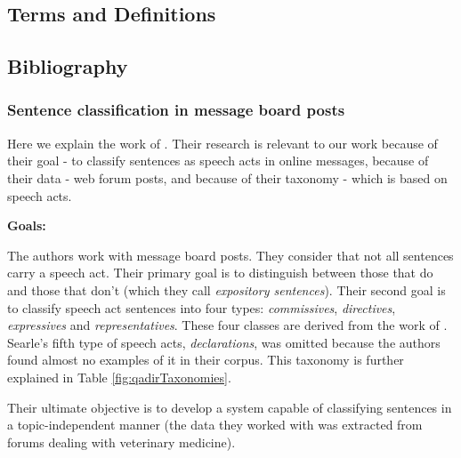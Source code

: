 \documentclass[11pt]{article}
\begin{document}

\subsection{Terms and Definitions}


\subsection{Bibliography}


\subsubsection{Sentence classification in message board posts}

Here we explain the work of \cite{qadir2011classifying}. Their research is relevant to our work because of their goal - to classify sentences as speech acts in online messages, because of their data - web forum posts, and because of their taxonomy - which is based on speech acts.

\vspace{0.5cm}
\textbf{Goals:}
\vspace{0.1cm}

The authors work with message board posts. They consider that not all sentences carry a speech act. Their primary goal is to distinguish between those that do and those that don't (which they call \textit{expository sentences}). Their second goal is to classify speech act sentences into four types: \textit{commissives}, \textit{directives}, \textit{expressives} and \textit{representatives}. These four classes are derived from the work of \cite{searle1976taxonomy}. Searle's fifth type of speech acts, \textit{declarations}, was omitted because the authors found almost no examples of it in their corpus.  This taxonomy is further explained in Table \ref{fig:qadirTaxonomies}.

Their ultimate objective is to develop a system capable of classifying sentences in a topic-independent manner (the data they worked with was extracted from forums dealing with veterinary medicine).
\end{document}
